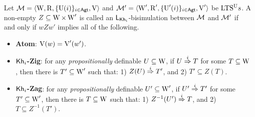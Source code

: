 \begin{definition}\label{def:bisim-khi}
Let $\mathcal{M} = \langle \operatorname{W},\operatorname{R},\{ \operatorname{U}(i) \}_{i\in{\rm \sf Agt}},\operatorname{V} \rangle$ and $\mathcal{M}' = \langle \operatorname{W}',\operatorname{R}',\{ \operatorname{U}'(i) \}_{i\in{\rm \sf Agt}},\operatorname{V}' \rangle$ be ${\textup{LTS$^\text{\textup{U}}$}}s$.
%
A non-empty $Z \subseteq \operatorname{W} \times \operatorname{W}'$ is called an $\mathsf{L}_{{\sf Kh}_i}$-bisimulation between $\mathcal{M}$ and $\mathcal{M}'$ if and only if $wZw'$ implies all of the following.
\begin{itemize} 
    \item \textbf{Atom}: $\operatorname{V}(w)=\operatorname{V}'(w')$.

    \item \textbf{${\sf Kh}_i$-Zig}: for any \emph{propositionally} definable $U \subseteq \operatorname{W}$, if $U \stackrel{i}{\Rightarrow} T$ for some $T \subseteq \operatorname{W}$, then there is $T' \subseteq \operatorname{W}'$ such that: 
        1) $Z(U) \stackrel{i}{\Rightarrow} T'$, and
        2) $T' \subseteq Z(T)$.

    \item \textbf{${\sf Kh}_i$-Zag}: %
    for any \emph{propositionally} definable $U' \subseteq \operatorname{W}'$, if $U' \stackrel{i}{\Rightarrow} T'$ for some $T' \subseteq \operatorname{W}'$, then there is $T \subseteq \operatorname{W}$ such that: 
        1) $Z^{-1}(U') \stackrel{i}{\Rightarrow} T$, and
        2) $T \subseteq Z^{-1}(T')$.


\end{itemize}
\end{definition}
